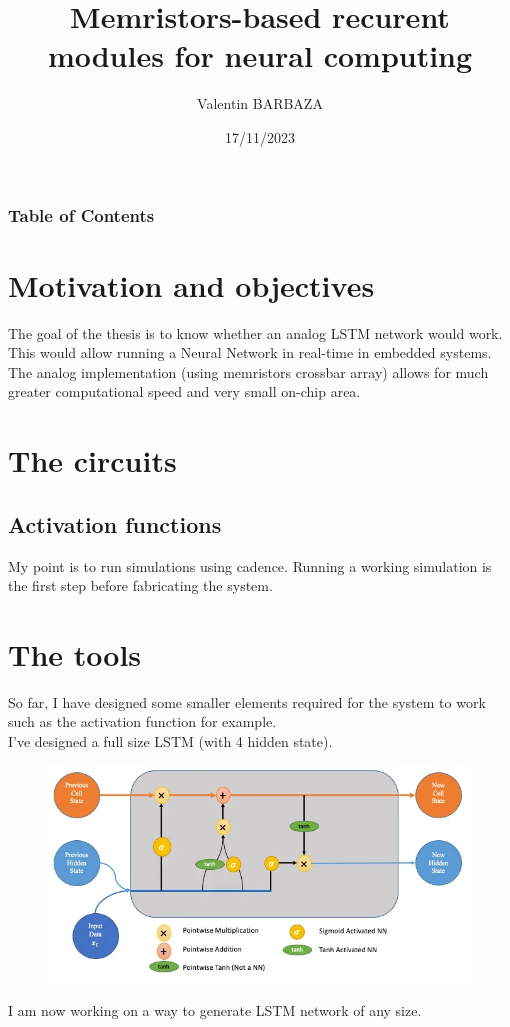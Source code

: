 \documentclass[table]{beamer}
\title{Memristors-based recurent modules for neural computing}
\subtitle{}
\institute[IST]{%
  Diogo Caetano\\
  INESC-MN
  \and{}%
  Ruxandra Barlulescu\\
  INESC-ID
  }
\author[V. BARBAZA]{Valentin BARBAZA}
\date{17/11/2023}
\begin{document}
  \frame{\titlepage}

  \begin{frame}
    \frametitle{Table of Contents}
    \tableofcontents
  \end{frame}

  \section{Motivation and objectives}
  \begin{frame}{\insertsection}{\insertsubsection}
    The goal of the thesis is to know whether an analog LSTM network would work. This would allow running a Neural Network in real-time in embedded systems. The analog implementation (using memristors crossbar array) allows for much greater computational speed and very small on-chip area.
  \end{frame}
  \section{The circuits}
  \subsection{Activation functions}
  \begin{frame}{\insertsection}{\insertsubsection}
    My point is to run simulations using cadence. Running a working simulation is the first step before fabricating the system.
  \end{frame}
  \section{The tools}
  \begin{frame}{\insertsection}{\insertsubsection}
    So far, I have designed some smaller elements required for the system to work such as the activation function for example.\\
    I've designed a full size LSTM (with 4 hidden state).
    \begin{figure}
      \centering
      \includegraphics[height=0.35\textheight]{lstm/lstm.png}
    \end{figure}
    I am now working on a way to generate LSTM network of any size.
  \end{frame}
\end{document}
